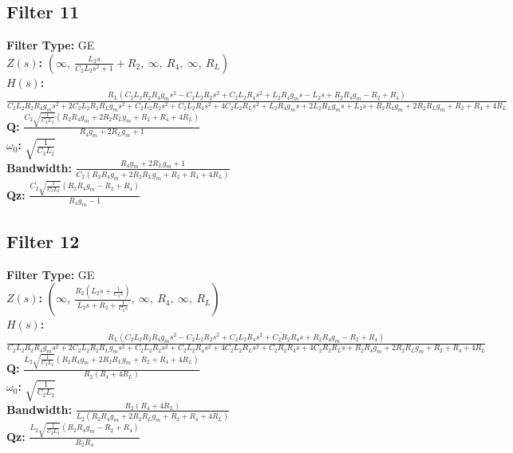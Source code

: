 \documentclass{article}
\begin{document}
\subsection*{Filter 11}
\textbf{Filter Type:} GE \\ 
\textbf{$Z(s)$:} $\left( \infty, \  \frac{L_{2} s}{C_{2} L_{2} s^{2} + 1} + R_{2}, \  \infty, \  R_{4}, \  \infty, \  R_{L}\right)$ \\ 
\textbf{$H(s)$:} $\frac{R_{L} \left(C_{2} L_{2} R_{2} R_{4} g_{m} s^{2} - C_{2} L_{2} R_{2} s^{2} + C_{2} L_{2} R_{4} s^{2} + L_{2} R_{4} g_{m} s - L_{2} s + R_{2} R_{4} g_{m} - R_{2} + R_{4}\right)}{C_{2} L_{2} R_{2} R_{4} g_{m} s^{2} + 2 C_{2} L_{2} R_{2} R_{L} g_{m} s^{2} + C_{2} L_{2} R_{2} s^{2} + C_{2} L_{2} R_{4} s^{2} + 4 C_{2} L_{2} R_{L} s^{2} + L_{2} R_{4} g_{m} s + 2 L_{2} R_{L} g_{m} s + L_{2} s + R_{2} R_{4} g_{m} + 2 R_{2} R_{L} g_{m} + R_{2} + R_{4} + 4 R_{L}}$ \\ 
\textbf{Q:} $\frac{C_{2} \sqrt{\frac{1}{C_{2} L_{2}}} \left(R_{2} R_{4} g_{m} + 2 R_{2} R_{L} g_{m} + R_{2} + R_{4} + 4 R_{L}\right)}{R_{4} g_{m} + 2 R_{L} g_{m} + 1}$ \\ 
\textbf{$\omega_0$:} $\sqrt{\frac{1}{C_{2} L_{2}}}$ \\ 
\textbf{Bandwidth:} $\frac{R_{4} g_{m} + 2 R_{L} g_{m} + 1}{C_{2} \left(R_{2} R_{4} g_{m} + 2 R_{2} R_{L} g_{m} + R_{2} + R_{4} + 4 R_{L}\right)}$ \\ 
\textbf{Qz:} $\frac{C_{2} \sqrt{\frac{1}{C_{2} L_{2}}} \left(R_{2} R_{4} g_{m} - R_{2} + R_{4}\right)}{R_{4} g_{m} - 1}$ \\ 
\subsection*{Filter 12}
\textbf{Filter Type:} GE \\ 
\textbf{$Z(s)$:} $\left( \infty, \  \frac{R_{2} \left(L_{2} s + \frac{1}{C_{2} s}\right)}{L_{2} s + R_{2} + \frac{1}{C_{2} s}}, \  \infty, \  R_{4}, \  \infty, \  R_{L}\right)$ \\ 
\textbf{$H(s)$:} $\frac{R_{L} \left(C_{2} L_{2} R_{2} R_{4} g_{m} s^{2} - C_{2} L_{2} R_{2} s^{2} + C_{2} L_{2} R_{4} s^{2} + C_{2} R_{2} R_{4} s + R_{2} R_{4} g_{m} - R_{2} + R_{4}\right)}{C_{2} L_{2} R_{2} R_{4} g_{m} s^{2} + 2 C_{2} L_{2} R_{2} R_{L} g_{m} s^{2} + C_{2} L_{2} R_{2} s^{2} + C_{2} L_{2} R_{4} s^{2} + 4 C_{2} L_{2} R_{L} s^{2} + C_{2} R_{2} R_{4} s + 4 C_{2} R_{2} R_{L} s + R_{2} R_{4} g_{m} + 2 R_{2} R_{L} g_{m} + R_{2} + R_{4} + 4 R_{L}}$ \\ 
\textbf{Q:} $\frac{L_{2} \sqrt{\frac{1}{C_{2} L_{2}}} \left(R_{2} R_{4} g_{m} + 2 R_{2} R_{L} g_{m} + R_{2} + R_{4} + 4 R_{L}\right)}{R_{2} \left(R_{4} + 4 R_{L}\right)}$ \\ 
\textbf{$\omega_0$:} $\sqrt{\frac{1}{C_{2} L_{2}}}$ \\ 
\textbf{Bandwidth:} $\frac{R_{2} \left(R_{4} + 4 R_{L}\right)}{L_{2} \left(R_{2} R_{4} g_{m} + 2 R_{2} R_{L} g_{m} + R_{2} + R_{4} + 4 R_{L}\right)}$ \\ 
\textbf{Qz:} $\frac{L_{2} \sqrt{\frac{1}{C_{2} L_{2}}} \left(R_{2} R_{4} g_{m} - R_{2} + R_{4}\right)}{R_{2} R_{4}}$ \\ 
\end{document}
